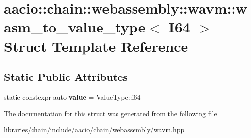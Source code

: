 \hypertarget{structaacio_1_1chain_1_1webassembly_1_1wavm_1_1wasm__to__value__type_3_01_i64_01_4}{}\section{aacio\+:\+:chain\+:\+:webassembly\+:\+:wavm\+:\+:wasm\+\_\+to\+\_\+value\+\_\+type$<$ I64 $>$ Struct Template Reference}
\label{structaacio_1_1chain_1_1webassembly_1_1wavm_1_1wasm__to__value__type_3_01_i64_01_4}
\subsection*{Static Public Attributes}
\begin{DoxyCompactItemize}
\item 
\mbox{\label{structaacio_1_1chain_1_1webassembly_1_1wavm_1_1wasm__to__value__type_3_01_i64_01_4_a5eb99be9b9b75350294ec92dc9025ff7}} 
static constexpr auto {\bfseries value} = Value\+Type\+::i64
\end{DoxyCompactItemize}


The documentation for this struct was generated from the following file\+:\begin{DoxyCompactItemize}
\item 
libraries/chain/include/aacio/chain/webassembly/wavm.\+hpp\end{DoxyCompactItemize}
